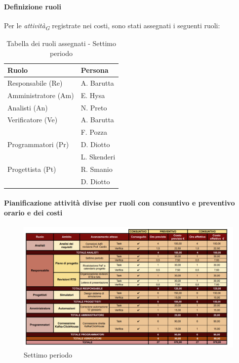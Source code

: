 \paragraph{Definizione ruoli}
Per le \textit{attività}\textsubscript{\textit{G}} registrate nei costi, sono stati assegnati i seguenti ruoli: 

\vspace{0.4cm}

\begin{table}[H]
    \centering
    \begin{tabular}{|L{4cm}|L{2cm}|}
        \hline
        \textbf{Ruolo} & \textbf{Persona} \\
        \hline
        \hline
        Responsabile (Re)   & A. Barutta \\
        \hline
        Amministratore (Am) & E. Hysa \\
        \hline
        Analisti (An)    & N. Preto \\
        \hline
        Verificatore (Ve)   & A. Barutta \\
                            & F. Pozza \\
        \hline
        Programmatori (Pr)  & D. Diotto\\
                            & L. Skenderi \\
        \hline
        Progettista (Pt)    & R. Smanio \\
                            & D. Diotto \\
        \hline
    \end{tabular}
    \caption{Tabella dei ruoli assegnati - Settimo periodo}
    \label{tab:Ruoli_persone_7}
    \end{table}

\newpage
\paragraph{Pianificazione attività divise per ruoli con consuntivo e preventivo orario e dei costi}

\vspace{0.4cm}

\begin{figure}[H]
    \centering
    \includegraphics[height=0.65\textwidth]{../Images/tabG7.PNG}
    \caption{Settimo periodo}
    \label{fig:Settimo_periodo}
\end{figure}


